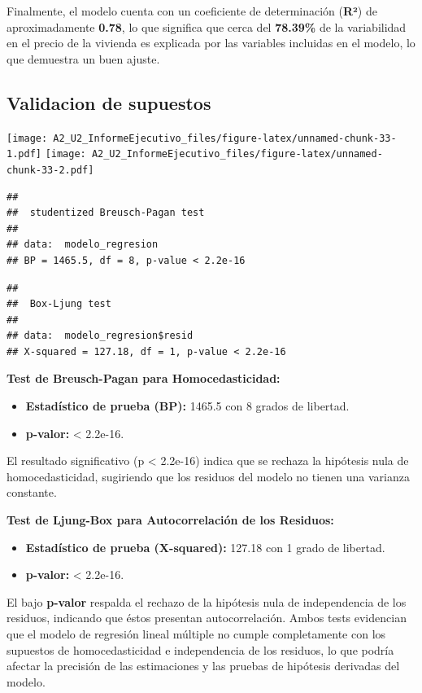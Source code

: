 \documentclass[
]{article}
\providecommand{\tightlist}{%
  \setlength{\itemsep}{0pt}\setlength{\parskip}{0pt}}
\begin{document}
Finalmente, el modelo cuenta con un coeficiente de determinación
(\textbf{R²}) de aproximadamente \textbf{0.78}, lo que significa que
cerca del \textbf{78.39\%} de la variabilidad en el precio de la
vivienda es explicada por las variables incluidas en el modelo, lo que
demuestra un buen ajuste.

\subsection{\texorpdfstring{\textbf{Validacion de
supuestos}}{Validacion de supuestos}}\label{validacion-de-supuestos}

\texttt{[image: A2\_U2\_InformeEjecutivo\_files/figure-latex/unnamed-chunk-33-1.pdf]}
\texttt{[image: A2\_U2\_InformeEjecutivo\_files/figure-latex/unnamed-chunk-33-2.pdf]}

\begin{verbatim}
## 
##  studentized Breusch-Pagan test
## 
## data:  modelo_regresion
## BP = 1465.5, df = 8, p-value < 2.2e-16
\end{verbatim}

\begin{verbatim}
## 
##  Box-Ljung test
## 
## data:  modelo_regresion$resid
## X-squared = 127.18, df = 1, p-value < 2.2e-16
\end{verbatim}

\textbf{Test de Breusch-Pagan para Homocedasticidad:}

\begin{itemize}
\tightlist
\item
  \textbf{Estadístico de prueba (BP):} 1465.5 con 8 grados de libertad.
\item
  \textbf{p-valor:} \textless{} 2.2e-16.
\end{itemize}

El resultado significativo (p \textless{} 2.2e-16) indica que se rechaza
la hipótesis nula de homocedasticidad, sugiriendo que los residuos del
modelo no tienen una varianza constante.

\textbf{Test de Ljung-Box para Autocorrelación de los Residuos:}

\begin{itemize}
\tightlist
\item
  \textbf{Estadístico de prueba (X-squared):} 127.18 con 1 grado de
  libertad.
\item
  \textbf{p-valor:} \textless{} 2.2e-16.
\end{itemize}

El bajo \textbf{p-valor} respalda el rechazo de la hipótesis nula de
independencia de los residuos, indicando que éstos presentan
autocorrelación. Ambos tests evidencian que el modelo de regresión
lineal múltiple no cumple completamente con los supuestos de
homocedasticidad e independencia de los residuos, lo que podría afectar
la precisión de las estimaciones y las pruebas de hipótesis derivadas
del modelo.
\end{document}
